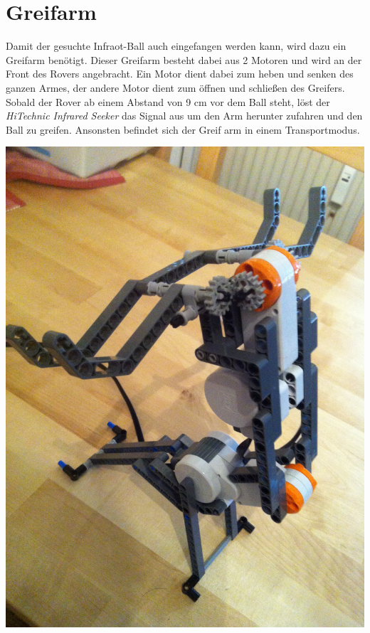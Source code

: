 \section{Greifarm}
Damit der gesuchte Infraot-Ball auch eingefangen werden kann, wird dazu ein Greifarm benötigt. Dieser Greifarm besteht dabei aus 2 Motoren und wird an der Front des Rovers angebracht. Ein Motor dient dabei zum heben und senken des ganzen Armes, der andere Motor dient zum öffnen und schließen des Greifers. Sobald der Rover ab einem Abstand von 9 cm vor dem Ball steht, löst der \textit{HiTechnic Infrared Seeker} das Signal aus um den Arm herunter zufahren und den Ball zu greifen. Ansonsten befindet sich der Greif arm in einem Transportmodus.

\begin{capfigure}
	\includegraphics[width=\textwidth]{images/construction/greifarm/Greifarm1}
\end{capfigure}


